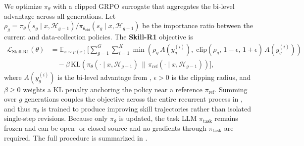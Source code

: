 We optimize $\pi_\theta$ with a clipped GRPO surrogate that aggregates the bi-level advantage across all generations.
Let $\rho_g = \pi_\theta(s_g \mid x, \mathcal{H}_{g-1}) / \pi_{\theta_{\mathrm{old}}}(s_g \mid x, \mathcal{H}_{g-1})$ be the importance ratio between the current and data-collection policies. The \textbf{Skill-R1} objective is
\begin{equation}
\begin{aligned}
\mathcal{L}_{\mathrm{Skill\text{-}R1}}(\theta)
&=
\mathbb{E}_{x \sim p(x)}
\Bigg[
\sum_{g=1}^{G}
\sum_{i=1}^{K}
\min\!\left(
  \rho_g\, A(y_g^{(i)}),\;
  \mathrm{clip}(\rho_g,\,1{-}\epsilon,\,1{+}\epsilon)\, A(y_g^{(i)})
\right)
\\
&\quad
-
\beta\,\mathrm{KL}\!\left(\pi_\theta(\cdot \mid x, \mathcal{H}_{g-1}) \,\|\, \pi_{\mathrm{ref}}(\cdot \mid x, \mathcal{H}_{g-1})\right)
\Bigg],
\end{aligned}
\label{eq:skillr1_obj}
\end{equation}
where $A(y_g^{(i)})$ is the bi-level advantage from , $\epsilon > 0$ is the clipping radius, and $\beta \ge 0$ weights a KL penalty anchoring the policy near a reference $\pi_{\mathrm{ref}}$.
Summing over $g$ generations couples the objective across the entire recurrent process in ,
and thus $\pi_\theta$ is trained to produce improving skill trajectories rather than isolated single-step revisions.
Because only $\pi_\theta$ is updated, the task LLM $\pi_{\mathrm{task}}$ remains frozen and can be open- or closed-source and no gradients through $\pi_{\mathrm{task}}$ are required.
The full procedure is summarized in .
